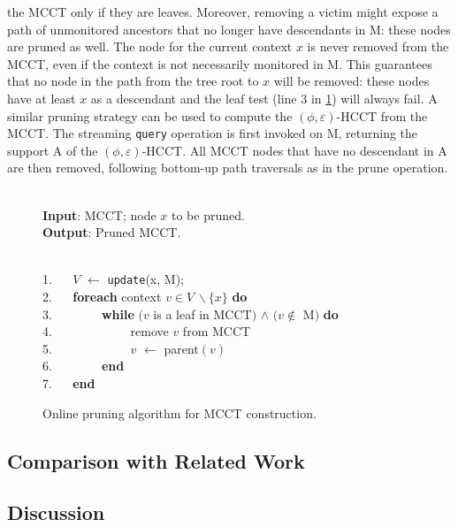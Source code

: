 \noindent
\fi
the MCCT only if they are leaves. Moreover, removing a victim might expose a path of unmonitored ancestors that no longer have descendants in M: these nodes are pruned as well. The node for the current context $x$ is never removed from the MCCT, even if the context is not necessarily monitored in M. This guarantees that no node in the path from the tree root to $x$ will be removed: these nodes have at least $x$ as a descendant and the leaf test (line 3 in \myalgorithm\ref{alg:hcct-update}) will always fail.
A similar pruning strategy can be used to compute the $(\phi,\varepsilon)$-HCCT from the MCCT. The streaming {\tt query} operation is first invoked on M, returning the support A of the $(\phi,\varepsilon)$-HCCT. All MCCT nodes that have no descendant in A are then removed, following bottom-up path traversals as in the prune operation.

\ifx\noauthorea\undefined
\begin{figure}[ht]
\caption{\label{alg:hcct-update} Online pruning algorithm for MCCT construction.\hfill}
\begin{small}
\begin{minipage}{0.9\textwidth}
\hrulefill\\
\textbf{Input}: {MCCT; node $x$ to be pruned.}\\
\textbf{Output}: {Pruned MCCT.}

\vspace{-1mm}
\hrulefill\\
1. ~~ $V$ $\gets$ {\tt update}(x, M);\\
2. ~~ \textbf{foreach} context $v\in V\,\backslash \{x\}$ \textbf{do}\\
3. ~~ ~~~~ \textbf{while} $(v$ is a leaf in MCCT$)$ $\wedge$ $(v\not\in$ M$)$ \textbf{do}\\
4. ~~ ~~~~ ~~~~ remove $v$ from MCCT\\
5. ~~ ~~~~ ~~~~ $v$ $\gets$ parent$(v)$\\
6. ~~ ~~~~ \textbf{end}\\
7. ~~ \textbf{end}

\vspace{-1mm}
\hrulefill
\vspace{-2mm}
\end{minipage}
\end{small}
\end{figure}
\fi



\subsection{Comparison with Related Work}

\subsection{Discussion}

